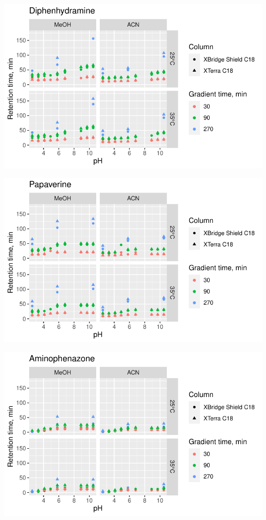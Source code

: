\documentclass[
  letterpaper,
  DIV=11,
  numbers=noendperiod]{scrreprt}
\begin{document}
\includegraphics{index_files/figure-pdf/unnamed-chunk-4-36.pdf}

\includegraphics{index_files/figure-pdf/unnamed-chunk-4-37.pdf}

\includegraphics{index_files/figure-pdf/unnamed-chunk-4-38.pdf}
\end{document}
